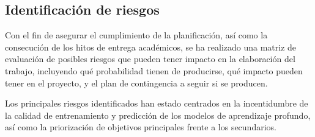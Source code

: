 \subsection{Identificación de riesgos}
Con el fin de asegurar el cumplimiento de la planificación, así como la consecución de los hitos de entrega académicos, se ha realizado una matriz de evaluación de posibles riesgos que pueden tener impacto en la elaboración del trabajo, incluyendo qué probabilidad tienen de producirse, qué impacto pueden tener en el proyecto, y el plan de contingencia a seguir si se producen.

Los principales riesgos identificados han estado centrados en la incentidumbre de la calidad de entrenamiento y predicción de los modelos de aprendizaje profundo, así como la priorización de objetivos principales frente a los secundarios.

